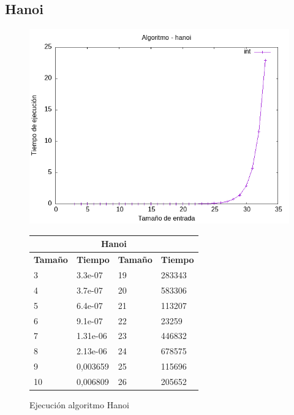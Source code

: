 \documentclass[11pt]{article}
\begin{document}
\subsection*{Hanoi}
\begin{figure}[H]
    \begin{minipage}{0.5\textwidth}
        \centering
        \includegraphics[width=\linewidth]{assets/Img/hanoiint.png}
        \caption{Ejecución algoritmo Hanoi}
        \label{fig:hanoi} 
    \end{minipage}%
    \begin{minipage}{0.5\textwidth}
        \centering
        \small
        \begin{tabular}{|l|l|l|l|}
        \hline
            \multicolumn{4}{|c|}{\cellcolor{blue!20}\textbf{Hanoi}} \\ \hline 
            \textbf{Tamaño} & \textbf{Tiempo} & \textbf{Tamaño} & \textbf{Tiempo} \\ \hline
            3 & 3.3e-07 & 19 & 283343 \\ \hline
            4 & 3.7e-07 & 20 & 583306 \\ \hline
            5 & 6.4e-07 & 21 & 113207 \\ \hline
            6 & 9.1e-07 & 22 & 23259 \\ \hline
            7 & 1.31e-06 & 23 & 446832 \\ \hline
            8 & 2.13e-06 & 24 & 678575 \\ \hline
            9 & 0,003659 & 25 & 115696 \\ \hline
            10 & 0,006809 & 26 & 205652 \\ \hline

\end{tabular}
\end{minipage}
\end{figure}
\end{document}
